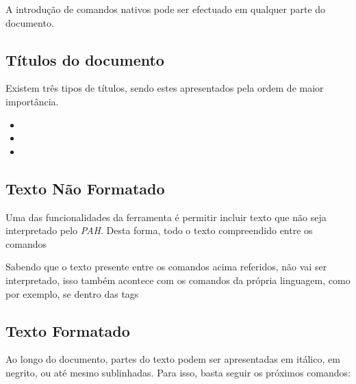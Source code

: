 \documentclass[11pt,a4paper]{article}
\begin{document}
A introdução de comandos nativos pode ser efectuado em qualquer parte do documento. \\  

\subsection{Títulos do documento}
Existem três tipos de títulos, sendo estes apresentados pela ordem de maior importância. \\  

\begin{itemize}
    \item \verb@ %t1{Título da secção} @
    \item \verb@ %t2{Título da subsecção} @
    \item \verb@ %t3{Título de subsubsecção} @
\end{itemize}

 

\subsection{Texto Não Formatado}
Uma das funcionalidades da ferramenta é permitir incluir texto que não seja interpretado pelo \textit{PAH}. Desta forma, todo o texto compreendido entre os comandos \verb@ %%verbatim% e %verbatim%% @, não será interpretado aquando da conversão entre os formatos, sendo este apresentado no documento sem quaisquer modificações. Este último caso é utilizado aquando da introdução de várias linhas. Caso o pretendido seja apenas a introdução de uma linha, basta introduzir o conteúdo dessa linha entre os comandos \begin{verbatim} %%verb% e %verb%% \end{verbatim}.  \\  

Sabendo que o texto presente entre os comandos acima referidos, não vai ser interpretado, isso também acontece com os comandos da própria linguagem, como por exemplo, se dentro das tags \verb@ %%verbatim% e %verbatim%% @ se encontrar a tag \verb@ %b{Latex} @, a palavra "Latex" não ficará a negrito, pois dentro destas tags não existe interpretação de comandos. 



\subsection{Texto Formatado}
Ao longo do documento, partes do texto podem ser apresentadas em itálico, em negrito, ou até mesmo sublinhadas. Para isso, basta seguir os próximos comandos: \\  
\end{document}
